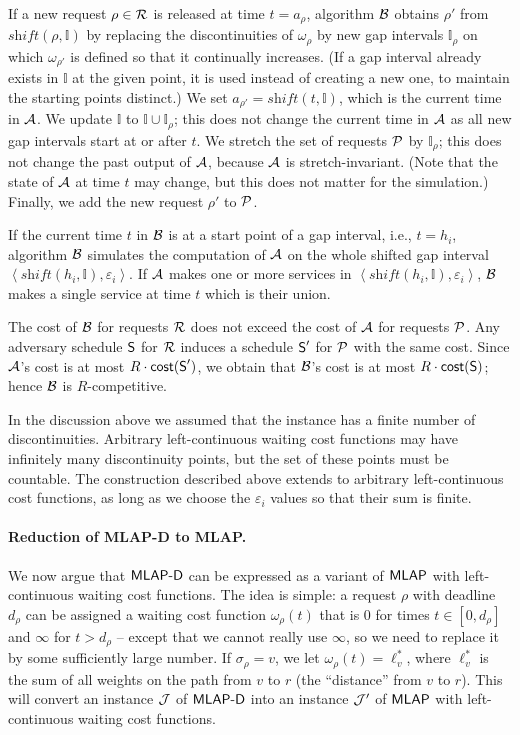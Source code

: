 \documentclass[a4paper]{article}
\newcommand{\calA}{{\cal A}}
\newcommand{\calB}{{\cal B}}
\newcommand{\calJ}{{\cal J}}
\newcommand{\calP}{{\cal P}}
\newcommand{\calR}{{\cal R}}
\newcommand{\bbI}{\mathbb{I}}
\newcommand{\eps}{{\varepsilon}}
\newcommand{\angled}[1]{{ \left\langle #1 \right\rangle }}
\newcommand{\cost}{\mbox{\rm\textsf{cost}}}
\newcommand{\length}{\ell}
\newcommand{\MLAP}{\mbox{\rm\textsf{MLAP}}}
\newcommand{\MLAPD}{\mbox{\rm\textsf{MLAP-D}}}
\newcommand{\schedS}{\mbox{\rm\textsf{S}}}
\newcommand{\shift}{{\textit{shift}}}
\newcommand{\trignode}{\sigma}
\begin{document}
If a new request $\rho\in\calR$ is released at time $t=a_\rho$,
algorithm $\calB$ obtains $\rho'$ from $\shift(\rho,\bbI)$ by
replacing the discontinuities of $\omega_\rho$ by new gap intervals $\bbI_\rho$
on which $\omega_{\rho'}$ is defined so that it continually
increases. (If a gap interval already exists in $\bbI$ at the
given point, it is used instead of creating a new one, to maintain the
starting points distinct.) We set
$a_{\rho'}=\shift(t,\bbI)$, which is the current time in $\calA$. We update
$\bbI$ to $\bbI\cup\bbI_\rho$; this does not change the current
time in $\calA$ as all  new gap intervals start at or after
$t$.  We stretch the set of requests $\calP$ by $\bbI_\rho$; this
does not change the past output of $\calA$, because $\calA$ is
stretch-invariant. (Note that the state of $\calA$ at time $t$ may change, but
this does not matter for the simulation.)
Finally, we add the new request $\rho'$ to $\calP$. 

If the current time $t$ in $\calB$ is at a start point of a
gap interval, i.e., $t=h_i$, algorithm $\calB$ simulates the
computation of $\calA$ on the whole shifted gap interval
$\angled{\shift(h_i,\bbI),\eps_i}$. If $\calA$ makes one or more
services in $\angled{\shift(h_i,\bbI),\eps_i}$, $\calB$ makes a
single service at time $t$ which is their union.

The cost of $\calB$ for requests $\calR$ does not exceed the cost of
$\calA$ for requests $\calP$.  Any adversary schedule $\schedS$ for
$\calR$ induces a schedule $\schedS'$ for $\calP$ with the same
cost. Since $\calA$'s cost is at most $R\cdot \cost(\schedS')$, we
obtain that $\calB$'s cost is at most $R\cdot\cost(\schedS)$;
hence $\calB$ is $R$-competitive.

In the discussion above we assumed that the instance has a finite number
of discontinuities. Arbitrary left-continuous waiting
cost functions may have infinitely many discontinuity points, but the
set of these points must be countable. The construction described
above extends to arbitrary left-continuous cost functions, as long as
we choose the $\eps_i$ values so that their sum is finite.


\paragraph{Reduction of {\MLAPD} to {\MLAP}.}

We now argue that $\MLAPD$ can be expressed as a
variant of $\MLAP$ with left-continuous waiting cost functions. The idea
is simple: a
request $\rho$ with deadline $d_\rho$ can be assigned a waiting cost
function $\omega_\rho(t)$ that is $0$ for times $t\in [0,d_\rho]$ and $\infty$
for $t > d_\rho$ -- 
except that we cannot really use $\infty$, so we need to replace it by
some sufficiently large number.
If $\trignode_\rho = v$, we let 
$\omega_\rho(t) = \length^\ast_v$, where $\length^\ast_v$ is the sum of all
weights on the path from $v$ to $r$ (the ``distance'' from $v$ to $r$).
This will convert an instance $\calJ$ of $\MLAPD$ into an
instance $\calJ'$ of $\MLAP$ with left-continuous waiting cost functions.
\end{document}
